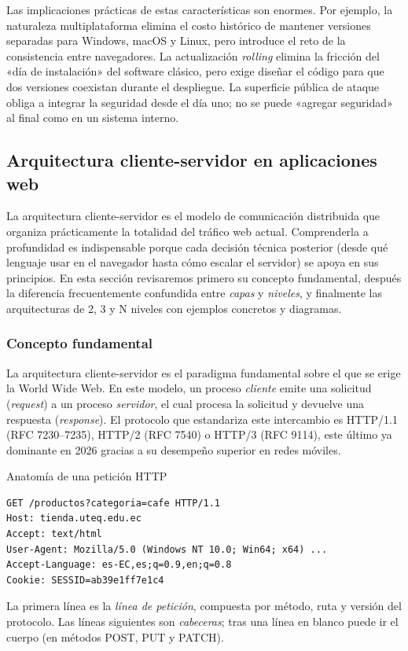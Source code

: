 \documentclass[11pt,a4paper,openany]{book}
\begin{document}
Las implicaciones prácticas de estas características son enormes. Por
ejemplo, la naturaleza multiplataforma elimina el costo histórico de
mantener versiones separadas para Windows, macOS y Linux, pero
introduce el reto de la consistencia entre navegadores. La actualización
\emph{rolling} elimina la fricción del «día de instalación» del
software clásico, pero exige diseñar el código para que dos versiones
coexistan durante el despliegue. La superficie pública de ataque obliga
a integrar la seguridad desde el día uno; no se puede «agregar
seguridad» al final como en un sistema interno.

\subsection{Arquitectura cliente-servidor en aplicaciones web}

La arquitectura cliente-servidor es el modelo de comunicación
distribuida que organiza prácticamente la totalidad del tráfico web
actual. Comprenderla a profundidad es indispensable porque cada
decisión técnica posterior (desde qué lenguaje usar en el navegador
hasta cómo escalar el servidor) se apoya en sus principios. En esta
sección revisaremos primero su concepto fundamental, después la
diferencia frecuentemente confundida entre \emph{capas} y
\emph{niveles}, y finalmente las arquitecturas de 2, 3 y N niveles
con ejemplos concretos y diagramas.

\subsubsection{Concepto fundamental}

La arquitectura cliente-servidor es el paradigma fundamental sobre el
que se erige la World Wide Web. En este modelo, un proceso
\emph{cliente} emite una solicitud (\emph{request}) a un proceso
\emph{servidor}, el cual procesa la solicitud y devuelve una respuesta
(\emph{response}). El protocolo que estandariza este intercambio es
HTTP/1.1 (RFC 7230--7235), HTTP/2 (RFC 7540) o HTTP/3 (RFC 9114), este
último ya dominante en 2026 gracias a su desempeño superior en redes
móviles.

\begin{cajadefinicion}{Anatomía de una petición HTTP}
\begin{lstlisting}[style=shell,numbers=none,caption={Ejemplo de Shell},label=lst:1.1]
GET /productos?categoria=cafe HTTP/1.1
Host: tienda.uteq.edu.ec
Accept: text/html
User-Agent: Mozilla/5.0 (Windows NT 10.0; Win64; x64) ...
Accept-Language: es-EC,es;q=0.9,en;q=0.8
Cookie: SESSID=ab39e1ff7e1c4
\end{lstlisting}
La primera línea es la \emph{línea de petición}, compuesta por método,
ruta y versión del protocolo. Las líneas siguientes son
\emph{cabeceras}; tras una línea en blanco puede ir el cuerpo (en
métodos POST, PUT y PATCH).
\end{cajadefinicion}
\end{document}
